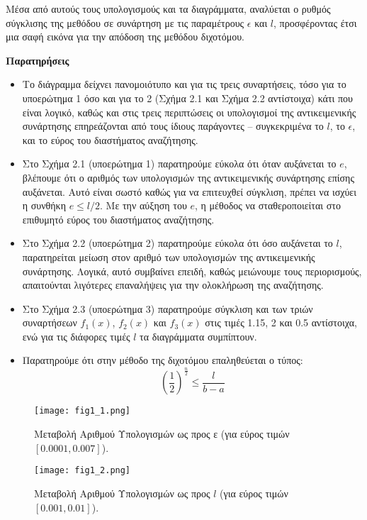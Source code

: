 \documentclass[a4paper,12pt]{report}
\begin{document}
\hspace{-0.6cm}Μέσα από αυτούς τους υπολογισμούς και τα διαγράμματα, αναλύεται ο ρυθμός σύγκλισης της μεθόδου σε συνάρτηση με τις παραμέτρους \(\epsilon\) και \(l\), προσφέροντας έτσι μια σαφή εικόνα για την απόδοση της μεθόδου διχοτόμου.

\vspace{0.8cm}
\hspace{-0.6cm}\textbf{Παρατηρήσεις}
\begin{itemize}
    \item Το διάγραμμα δείχνει πανομοιότυπο και για τις τρεις συναρτήσεις, τόσο για το υποερώτημα 1 όσο και για το 2 (Σχήμα 2.1 και Σχήμα 2.2 αντίστοιχα) κάτι που είναι λογικό, καθώς και στις τρεις περιπτώσεις οι υπολογισμοί της αντικειμενικής συνάρτησης επηρεάζονται από τους ίδιους παράγοντες – συγκεκριμένα το \( l \), το \( \epsilon \), και το εύρος του διαστήματος αναζήτησης.
    \item Στο Σχήμα 2.1 (υποερώτημα 1) παρατηρούμε εύκολα ότι όταν αυξάνεται το \( e \), βλέπουμε ότι ο αριθμός των υπολογισμών της αντικειμενικής συνάρτησης επίσης αυξάνεται. Αυτό είναι σωστό καθώς για να επιτευχθεί σύγκλιση, πρέπει να ισχύει η συνθήκη \( e \leq l/2 \). Με την αύξηση του \( e \), η μέθοδος να σταθεροποιείται στο επιθυμητό εύρος του διαστήματος αναζήτησης.
    \item Στο Σχήμα 2.2 (υποερώτημα 2) παρατηρούμε εύκολα ότι όσο αυξάνεται το \( l \), παρατηρείται μείωση στον αριθμό των υπολογισμών της αντικειμενικής συνάρτησης. Λογικά, αυτό συμβαίνει επειδή, καθώς μειώνουμε τους περιορισμούς, απαιτούνται λιγότερες επαναλήψεις για την ολοκλήρωση της αναζήτησης.
    \item Στο Σχήμα 2.3 (υποερώτημα 3) παρατηρούμε σύγκλιση και των τριών συναρτήσεων \( f_1(x) \), \( f_2(x) \) και \( f_3(x) \) στις τιμές 1.15, 2 και 0.5 αντίστοιχα, ενώ για τις διάφορες τιμές \( l \) τα διαγράμματα συμπίπτουν.
    \item Παρατηρούμε ότι στην μέθοδο της διχοτόμου επαληθεύεται ο τύπος:\[
    \left(\frac{1}{2}\right)^{\frac{n}{2}} \leq \frac{l}{b - a}
    \]

\end{itemize}

\begin{figure}[ht!]
    \centering
    \texttt{[image: fig1\_1.png]} 
    \caption{Μεταβολή Αριθμού Υπολογισμών ως προς ε (για εύρος τιμών \([0.0001, 0.007]\)).}
\end{figure}

\begin{figure}[ht!]
    \centering
    \texttt{[image: fig1\_2.png]} 
    \caption{Μεταβολή Αριθμού Υπολογισμών ως προς \( l \) (για εύρος τιμών \([0.001, 0.01]\)).}
\end{figure}
\end{document}
